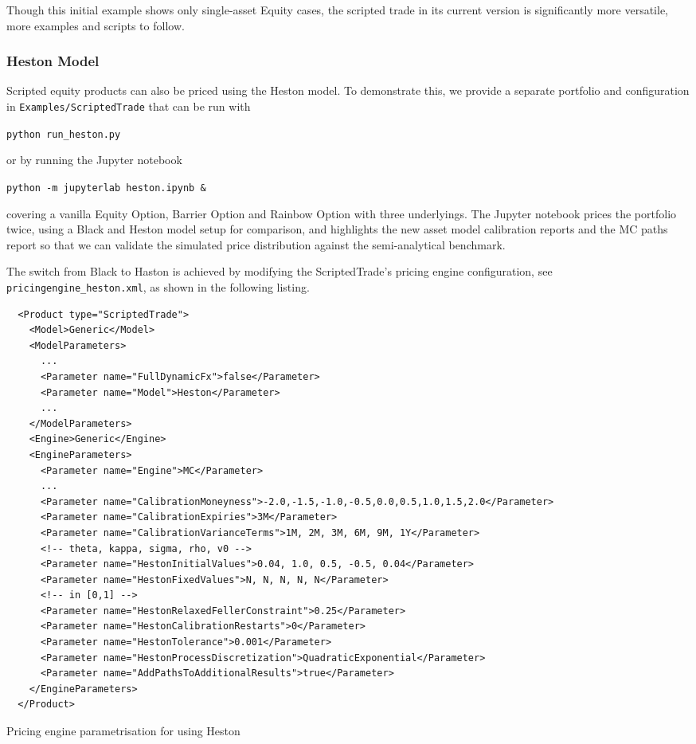 Though this initial example shows only single-asset Equity cases, the scripted trade in its current version is
significantly more versatile, more examples and scripts to follow.

\subsubsection{Heston Model}

Scripted equity products can also be priced using the Heston model. To demonstrate this, we provide a separate portfolio and
configuration in {\tt Examples/ScriptedTrade} that can be run with

\medskip
\centerline{\tt python run\_heston.py}

\medskip
or by running the Jupyter notebook

\medskip
\centerline{\tt python -m jupyterlab heston.ipynb \&}

\medskip
covering a vanilla Equity Option, Barrier Option and Rainbow Option with three underlyings. The Jupyter notebook prices
the portfolio twice, using a Black and Heston model setup for comparison, and highlights the new asset model calibration reports
and the MC paths report so that we can validate the simulated price distribution against the semi-analytical benchmark.

The switch from Black to Haston is achieved by modifying the ScriptedTrade's pricing engine configuration, see
{\tt pricingengine\_heston.xml}, as shown in the following listing.

\begin{listing}[H]
\begin{verbatim}
  <Product type="ScriptedTrade">
    <Model>Generic</Model>
    <ModelParameters>
      ...
      <Parameter name="FullDynamicFx">false</Parameter>
      <Parameter name="Model">Heston</Parameter>
      ...
    </ModelParameters>
    <Engine>Generic</Engine>
    <EngineParameters>
      <Parameter name="Engine">MC</Parameter>
      ...
      <Parameter name="CalibrationMoneyness">-2.0,-1.5,-1.0,-0.5,0.0,0.5,1.0,1.5,2.0</Parameter>
      <Parameter name="CalibrationExpiries">3M</Parameter>
      <Parameter name="CalibrationVarianceTerms">1M, 2M, 3M, 6M, 9M, 1Y</Parameter>
      <!-- theta, kappa, sigma, rho, v0 -->
      <Parameter name="HestonInitialValues">0.04, 1.0, 0.5, -0.5, 0.04</Parameter> 
      <Parameter name="HestonFixedValues">N, N, N, N, N</Parameter>                
      <!-- in [0,1] -->
      <Parameter name="HestonRelaxedFellerConstraint">0.25</Parameter>             
      <Parameter name="HestonCalibrationRestarts">0</Parameter>                    
      <Parameter name="HestonTolerance">0.001</Parameter>                          
      <Parameter name="HestonProcessDiscretization">QuadraticExponential</Parameter>
      <Parameter name="AddPathsToAdditionalResults">true</Parameter>
    </EngineParameters>
  </Product>
\end{verbatim}
\caption{Pricing engine parametrisation for using Heston}
\end{listing}


